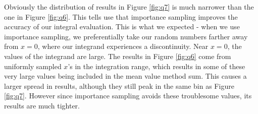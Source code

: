 \documentclass[a4paper,12pt]{article}
\begin{document}
Obviously the distribution of results in Figure \ref{fig:q7} is much narrower than the one in Figure \ref{fig:q6}. This tells use that importance sampling improves the accuracy of our integral evaluation. This is what we expected - when we use importance sampling, we preferentially take our random numbers farther away from $x = 0$, where our integrand experiences a discontinuity. Near $x = 0$, the values of the integrand are large. The results in Figure \ref{fig:q6} come from uniformly sampled $x$'s in the integration range, which results in some of these very large values being included in the mean value method sum. This causes a larger spread in results, although they still peak in the same bin as Figure \ref{fig:q7}. However since importance sampling avoids these troublesome values, its results are much tighter.
\end{document}
